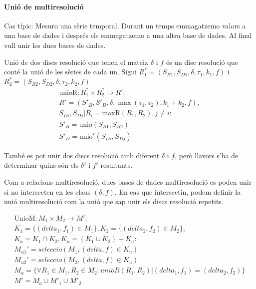 \paragraph{Unió de multiresolució}

Cas típic:
Mesuro una sèrie temporal. Durant un temps emmagatzemo valors a una
base de dades i després els emmagatzemo a una altra base de dades. Al final vull unir les dues bases de dades.


Unió de dos discs resolució que tenen el mateix $\delta$ i $f$ és un
disc resolució que conté la unió de les sèries de cada un.  Sigui
$R_1^*=(S_{B1},S_{D1},\delta,\tau_1,k_1,f)$ i
$R_2^*=(S_{B2},S_{D2},\delta,\tau_2,k_2,f)$
  \begin{gather*}
    \text{unioR}: R_1^* \times R_2^* \longrightarrow R': \\
    R' = (S'_B,S'_D,\delta,\max(\tau_1,\tau_2),k_1+k_2,f), \\
    S_{Di}, S_{Dj} | R_i = \text{maxR}(R_1,R_2), j \neq i:  \\
    S'_B = \text{unio}(S_{B1},S_{B2})\\
    S'_D = \text{unio}^r(S_{Di},S_{Dj})
\end{gather*}

També es pot unir dos discs resolució amb diferent $\delta$ i $f$,
però llavors s'ha de determinar quins són els $\delta'$ i $f'$
resultants.


Com a relacions multiresolució, dues bases de dades multiresolució es
poden unir si no intersecten en les claus $(\delta,f)$.  En cas que
intersectin, podem definir la unió multiresolució com la unió que sap unir els discs resolució repetits.

\begin{gather*}
    \text{UnioM}: M_1 \times M_2 \longrightarrow M': \\
    K_1 = \{(delta_1,f_1) \in M_1\},K_2 = \{(delta_2,f_2) \in M_2\}, \\
    K_a = K_1 \cap K_2, K_u =  (K_1 \cup K_2) - K_a : \\
    M_{u1}'= seleccio(M_1, (delta,f) \in K_u)\\
    M_{u2}'= seleccio(M_2, (delta,f) \in K_u)\\
    M_a = \{\forall R_1\in M_1,R_2\in M_2: unioR(R_1,R_2) |
       (delta_1,f_1) = (delta_2,f_2) \} \\
    M' =  M_{a} \cup  M'_{1}  \cup  M'_{2}     
\end{gather*}






